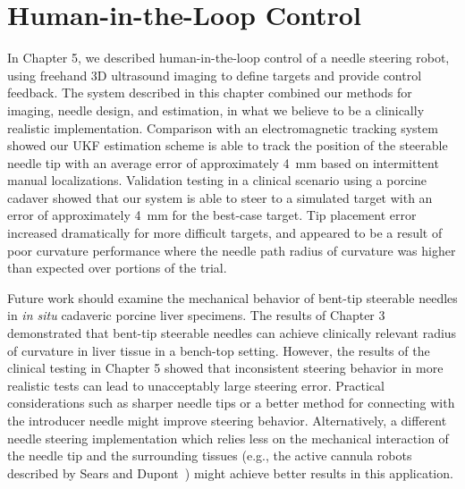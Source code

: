 \section{Human-in-the-Loop Control} 
In Chapter 5, we described human-in-the-loop control of a needle steering robot, using freehand 3D ultrasound imaging to define targets and provide control feedback. The system described in this chapter combined our methods for imaging, needle design, and estimation, in what we believe to be a clinically realistic implementation. Comparison with an electromagnetic tracking system showed our UKF estimation scheme is able to track the position of the steerable needle tip with an average error of approximately 4~mm based on intermittent manual localizations. Validation testing in a clinical scenario using a porcine cadaver showed that our system is able to steer to a simulated target with an error of approximately 4~mm for the best-case target. Tip placement error increased dramatically for more difficult targets, and appeared to be a result of poor curvature performance where the needle path radius of curvature was higher than expected over portions of the trial. 

Future work should examine the mechanical behavior of bent-tip steerable needles in \textit{in situ} cadaveric porcine liver specimens. The results of Chapter 3 demonstrated that bent-tip steerable needles can achieve clinically relevant radius of curvature in liver tissue in a bench-top setting. However, the results of the clinical testing in Chapter 5 showed that inconsistent steering behavior in more realistic tests can lead to unacceptably large steering error. Practical considerations such as sharper needle tips or a better method for connecting with the introducer needle might improve steering behavior. Alternatively, a different needle steering implementation which relies less on the mechanical interaction of the needle tip and the surrounding tissues (e.g., the active cannula robots described by Sears and Dupont~\cite{Sears2006}) might achieve better results in this application.

